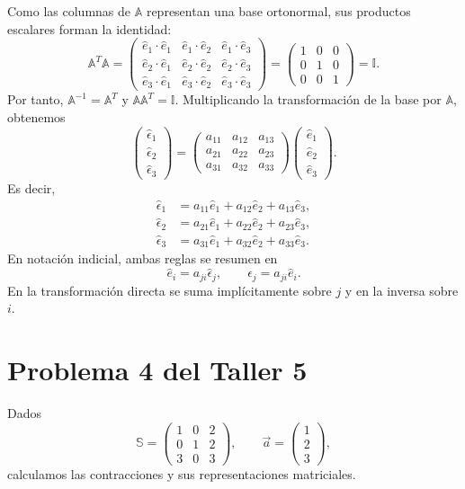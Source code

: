 Como las columnas de $\mathbb A$ representan una base ortonormal, sus productos escalares forman la identidad:
\[
\mathbb A^T\mathbb A
=\begin{pmatrix}
\hat e_1\cdot\hat e_1&\hat e_1\cdot\hat e_2&\hat e_1\cdot\hat e_3\\
\hat e_2\cdot\hat e_1&\hat e_2\cdot\hat e_2&\hat e_2\cdot\hat e_3\\
\hat e_3\cdot\hat e_1&\hat e_3\cdot\hat e_2&\hat e_3\cdot\hat e_3
\end{pmatrix}
=\begin{pmatrix}1&0&0\\0&1&0\\0&0&1\end{pmatrix}
=\mathbb I.
\]
Por tanto, $\mathbb A^{-1}=\mathbb A^T$ y $\mathbb A\mathbb A^T=\mathbb I$. Multiplicando la transformación de la base por $\mathbb A$, obtenemos
\[
\begin{pmatrix}\hat\epsilon_1\\\hat\epsilon_2\\\hat\epsilon_3\end{pmatrix}
=\begin{pmatrix}
a_{11}&a_{12}&a_{13}\\
a_{21}&a_{22}&a_{23}\\
a_{31}&a_{32}&a_{33}
\end{pmatrix}
\begin{pmatrix}\hat e_1\\\hat e_2\\\hat e_3\end{pmatrix}.
\]
Es decir,
\[
\begin{aligned}
\hat\epsilon_1&=a_{11}\hat e_1+a_{12}\hat e_2+a_{13}\hat e_3,\\
\hat\epsilon_2&=a_{21}\hat e_1+a_{22}\hat e_2+a_{23}\hat e_3,\\
\hat\epsilon_3&=a_{31}\hat e_1+a_{32}\hat e_2+a_{33}\hat e_3.
\end{aligned}
\]
En notación indicial, ambas reglas se resumen en
\[
\boxed{\hat e_i=a_{ji}\hat\epsilon_j},
\qquad
\boxed{\hat\epsilon_j=a_{ji}\hat e_i}.
\]
En la transformación directa se suma implícitamente sobre $j$ y en la inversa sobre $i$.

\section{Problema 4 del Taller 5}

Dados
\[
\mathbb S=\begin{pmatrix}1&0&2\\0&1&2\\3&0&3\end{pmatrix},
\qquad \vec a=\begin{pmatrix}1\\2\\3\end{pmatrix},
\]
calculamos las contracciones y sus representaciones matriciales.


